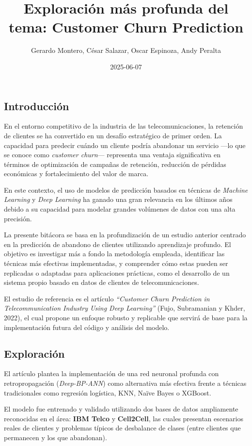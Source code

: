 \documentclass[
  letterpaper,
  DIV=11,
  numbers=noendperiod]{scrartcl}
\title{Exploración más profunda del tema: Customer Churn Prediction}
\author{Gerardo Montero, César Salazar, Oscar Espinoza, Andy Peralta}
\date{2025-06-07}
\begin{document}
\maketitle


\subsection{Introducción}\label{introducciuxf3n}

En el entorno competitivo de la industria de las telecomunicaciones, la
retención de clientes se ha convertido en un desafío estratégico de
primer orden. La capacidad para predecir cuándo un cliente podría
abandonar un servicio ---lo que se conoce como \emph{customer churn}---
representa una ventaja significativa en términos de optimización de
campañas de retención, reducción de pérdidas económicas y
fortalecimiento del valor de marca.

En este contexto, el uso de modelos de predicción basados en técnicas de
\emph{Machine Learning} y \emph{Deep Learning} ha ganado una gran
relevancia en los últimos años debido a su capacidad para modelar
grandes volúmenes de datos con una alta precisión.

La presente bitácora se basa en la profundización de un estudio anterior
centrado en la predicción de abandono de clientes utilizando aprendizaje
profundo. El objetivo es investigar más a fondo la metodología empleada,
identificar las técnicas más efectivas implementadas, y comprender cómo
estas pueden ser replicadas o adaptadas para aplicaciones prácticas,
como el desarrollo de un sistema propio basado en datos de clientes de
telecomunicaciones.

El estudio de referencia es el artículo \emph{``Customer Churn
Prediction in Telecommunication Industry Using Deep Learning''} (Fujo,
Subramanian y Khder, 2022), el cual propone un enfoque robusto y
replicable que servirá de base para la implementación futura del código
y análisis del modelo.

\subsection{Exploración}\label{exploraciuxf3n}

El artículo plantea la implementación de una red neuronal profunda con
retropropagación (\emph{Deep-BP-ANN}) como alternativa más efectiva
frente a técnicas tradicionales como regresión logística, KNN, Naïve
Bayes o XGBoost.

El modelo fue entrenado y validado utilizando dos bases de datos
ampliamente reconocidas en el área: \textbf{IBM Telco} y
\textbf{Cell2Cell}, las cuales presentan escenarios reales de clientes y
problemas típicos de desbalance de clases (entre clientes que permanecen
y los que abandonan).
\end{document}
